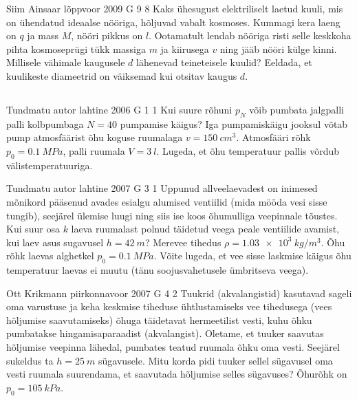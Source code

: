 \documentclass[11pt, twoside]{article}
\begin{document}
{%
{Siim Ainsaar} %
{lõppvoor} %
{2009} %
{G 9} %
{8} %
{
\ifStatement
Kaks ühesugust elektriliselt laetud
kuuli, mis on ühendatud ideaalse nööriga, hõljuvad vabalt kosmoses. Kummagi
kera laeng on $q$ ja mass $M$, nööri pikkus on $l$.
Ootamatult lendab nööriga risti selle keskkoha pihta kosmoseprügi tükk massiga $m$ ja kiirusega
$v$ ning jääb nööri külge kinni. Millisele vähimale kaugusele $d$ lähenevad teineteisele kuulid?
Eeldada, et kuulikeste diameetrid on väiksemad kui otsitav kaugus $d$.
\fi
}
\newpage\subsection{\protect{}}

{Tundmatu autor} %
{lahtine} %
{2006} %
{G 1} %
{1} %
{
\ifStatement
Kui suure rõhuni $p_N$ võib pumbata jalgpalli palli kolbpumbaga $N = 40$ pumpamise käigus? Iga pumpamiskäigu jooksul võtab pump atmosfäärist õhu koguse ruumalaga $v = \SI{150}{cm^3}$. Atmosfääri rõhk $p_0 = \SI{0,1}{MPa}$, palli ruumala $V = \SI{3}{l}$. Lugeda, et õhu temperatuur pallis võrdub välistemperatuuriga.
\fi
}

{Tundmatu autor} %
{lahtine} %
{2007} %
{G 3} %
{1} %
{
\ifStatement
Uppunud allveelaevadest on inimesed mõnikord pääsenud avades esialgu alumised ventiilid (mida mööda vesi sisse tungib), seejärel ülemise luugi ning siis ise koos õhumulliga veepinnale tõustes. Kui suur osa $k$ laeva ruumalast polnud täidetud veega peale ventiilide avamist, kui laev asus sugavusel $h = \SI{42}{m}$? Merevee tihedus $\rho = \SI{1,03e3}{kg/m^3}$. Õhu rõhk laevas alghetkel $p_0 = \SI{0,1}{MPa}$. Võite lugeda, et vee sisse laskmise käigus õhu temperatuur laevas ei muutu (tänu soojusvahetusele ümbritseva veega).
\fi
}

{Ott Krikmann} %
{piirkonnavoor} %
{2007} %
{G 4} %
{2} %
{
\ifStatement
Tuukrid (akvalangistid) kasutavad sageli oma varustuse ja keha keskmise tiheduse ühtlustamiseks vee tihedusega (vees hõljumise saavutamiseks) õhuga täidetavat hermeetilist vesti, kuhu õhku pumbatakse hingamisaparaadist (akvalangist). Oletame, et tuuker saavutas hõljumise veepinna lähedal, pumbates teatud ruumala õhku oma vesti. Seejärel sukeldus ta $h = \SI{25}{m}$ sügavusele. Mitu korda pidi tuuker sellel sügavusel oma vesti ruumala suurendama, et saavutada hõljumise selles sügavuses? Õhurõhk on $p_0 = \SI{105}{kPa}$.
\fi
}

}
\end{document}
